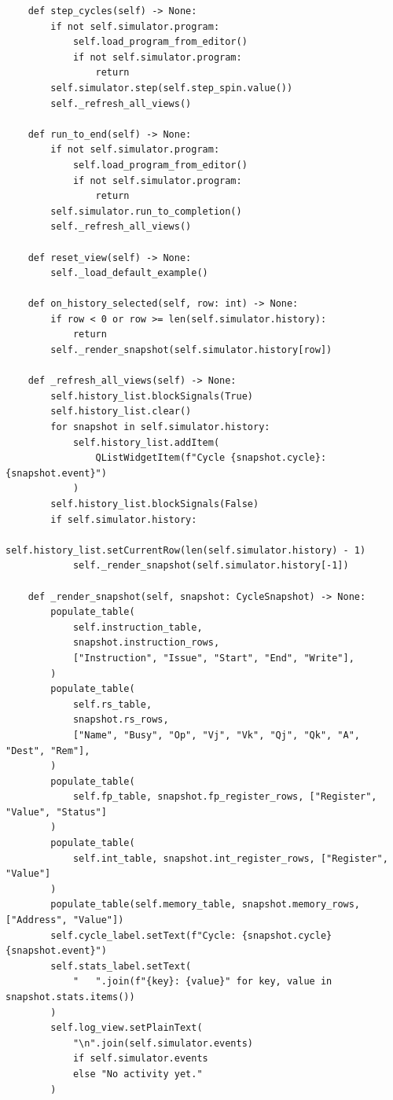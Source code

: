 \documentclass[12pt,a4paper]{ctexart}
\begin{document}
\begin{lstlisting}
    def step_cycles(self) -> None:
        if not self.simulator.program:
            self.load_program_from_editor()
            if not self.simulator.program:
                return
        self.simulator.step(self.step_spin.value())
        self._refresh_all_views()

    def run_to_end(self) -> None:
        if not self.simulator.program:
            self.load_program_from_editor()
            if not self.simulator.program:
                return
        self.simulator.run_to_completion()
        self._refresh_all_views()

    def reset_view(self) -> None:
        self._load_default_example()

    def on_history_selected(self, row: int) -> None:
        if row < 0 or row >= len(self.simulator.history):
            return
        self._render_snapshot(self.simulator.history[row])

    def _refresh_all_views(self) -> None:
        self.history_list.blockSignals(True)
        self.history_list.clear()
        for snapshot in self.simulator.history:
            self.history_list.addItem(
                QListWidgetItem(f"Cycle {snapshot.cycle}: {snapshot.event}")
            )
        self.history_list.blockSignals(False)
        if self.simulator.history:
            self.history_list.setCurrentRow(len(self.simulator.history) - 1)
            self._render_snapshot(self.simulator.history[-1])

    def _render_snapshot(self, snapshot: CycleSnapshot) -> None:
        populate_table(
            self.instruction_table,
            snapshot.instruction_rows,
            ["Instruction", "Issue", "Start", "End", "Write"],
        )
        populate_table(
            self.rs_table,
            snapshot.rs_rows,
            ["Name", "Busy", "Op", "Vj", "Vk", "Qj", "Qk", "A", "Dest", "Rem"],
        )
        populate_table(
            self.fp_table, snapshot.fp_register_rows, ["Register", "Value", "Status"]
        )
        populate_table(
            self.int_table, snapshot.int_register_rows, ["Register", "Value"]
        )
        populate_table(self.memory_table, snapshot.memory_rows, ["Address", "Value"])
        self.cycle_label.setText(f"Cycle: {snapshot.cycle}    {snapshot.event}")
        self.stats_label.setText(
            "   ".join(f"{key}: {value}" for key, value in snapshot.stats.items())
        )
        self.log_view.setPlainText(
            "\n".join(self.simulator.events)
            if self.simulator.events
            else "No activity yet."
        )



\end{lstlisting}
\end{document}
